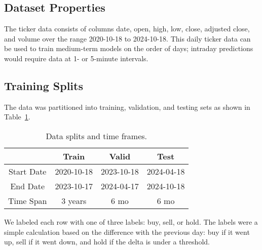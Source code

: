 \documentclass[10pt,twocolumn,letterpaper]{article}
\begin{document}
\subsection{Dataset Properties}

The ticker data consists of columns date, open, high, low, close, adjusted close, and volume over the range 2020-10-18 to 2024-10-18. This daily ticker data can be used to train medium-term models on the order of days; intraday predictions would require data at 1- or 5-minute intervals.

\subsection{Training Splits}

The data was partitioned into training, validation, and testing sets as shown in Table~\ref{tab:trainingsplits}.


\begin{table}
\begin{center}
    \begin{tabular}{|c|c|c|c|}
\hline
        & Train & Valid & Test \\
\hline
        Start Date & 2020-10-18 & 2023-10-18 & 2024-04-18 \\
\hline
        End Date & 2023-10-17 & 2024-04-17 & 2024-10-18 \\
\hline
        Time Span & 3 years & 6 mo & 6 mo \\
\hline
\end{tabular}
\end{center}
    \caption{Data splits and time frames.}
\label{tab:trainingsplits}
\end{table}

We labeled each row with one of three labels: buy, sell, or hold. The labels were a simple calculation based on the difference with the previous day: buy if it went up, sell if it went down, and hold if the delta is under a threshold.
\end{document}
